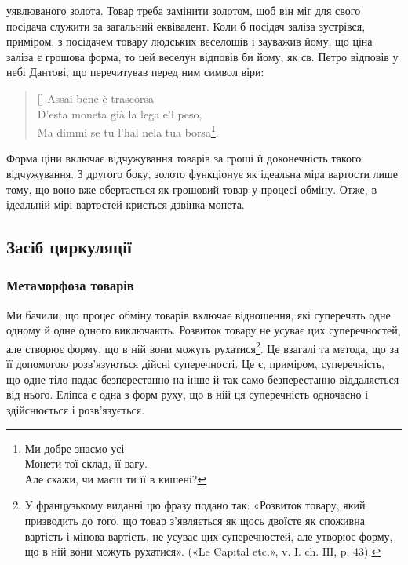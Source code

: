 \parcont{}  %
уявлюваного золота. Товар треба замінити золотом, щоб він міг
для свого посідача служити за загальний еквівалент. Коли б
посідач заліза зустрівся, приміром, з посідачем товару людських
веселощів і зауважив йому, що ціна заліза є грошова форма,
то цей веселун відповів би йому, як св. Петро відповів у небі
Дантові, що перечитував перед ним символ віри:
\settowidth{\versewidth}{Is just as much as it will bring».}
\begin{verse}[\versewidth]
Assai bene è trascorsa\\
D’esta moneta già la lega e’l peso,\\
Ma dimmi se tu l’hal nela tua borsa\footnote*{
\noindent
Ми добре знаємо усі\\
Монети тої склад, її вагу.\\
Але скажи, чи маєш ти її в кишені?}.

\end{verse}

Форма ціни включає відчужування товарів за гроші й доконечність
такого відчужування. З другого боку, золото функціонує
як ідеальна міра вартости лише тому, що воно вже обертається
як грошовий товар у процесі обміну. Отже, в ідеальній
мірі вартостей криється дзвінка монета.

\subsection{Засіб циркуляції}
\subsubsection{Метаморфоза товарів}

Ми бачили, що процес обміну товарів включає відношення,
які суперечать одне одному й одне одного виключають. Розвиток
товару не усуває цих суперечностей, але створює форму, що в
ній вони можуть рухатися\footnote*{
У французькому виданні цю фразу подано так: «Розвиток товару,
який призводить до того, що товар з’являється як щось двоїсте як споживна
вартість і мінова вартість, не усуває цих суперечностей, але утворює
форму, що в ній вони можуть рухатися». («Le Capital etc.», v. I. ch. IІІ,
p. 43). \Red
}. Це взагалі та метода, що за її допомогою
розв’язуються дійсні суперечності. Це є, приміром, суперечність,
що одне тіло падає безперестанно на інше й так само безперестанно
віддаляється від нього. Еліпса є одна з форм руху,
що в ній ця суперечність одночасно і здійснюється і розв’язується.

